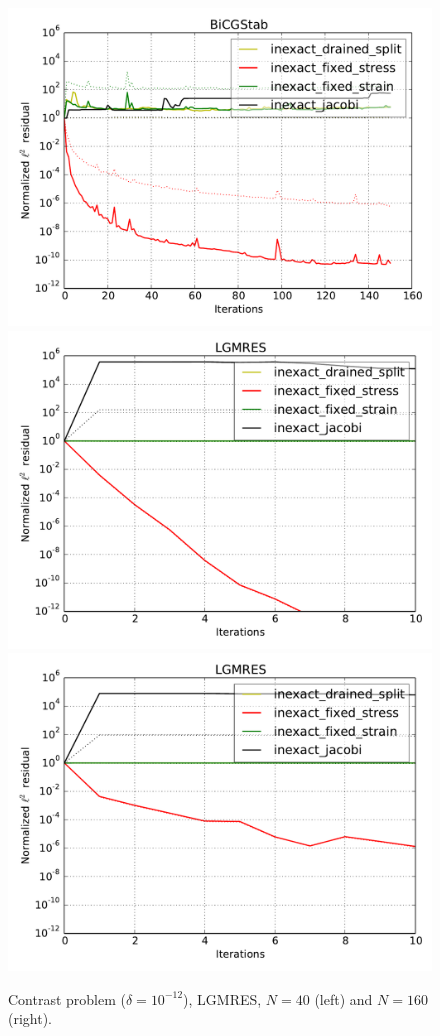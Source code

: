 \documentclass{article}
\begin{document}
\begin{figure}
\begin{center}
\includegraphics[width=0.49\linewidth]{../new-BiCGStab,problem=12,exact=0,N=160,cycles=1.pdf}
\includegraphics[width=0.49\linewidth]{../new-LGMRES,problem=12,exact=0,N=40,cycles=1.pdf}
\includegraphics[width=0.49\linewidth]{../new-LGMRES,problem=12,exact=0,N=160,cycles=1.pdf}
\caption{Contrast problem ($\delta=10^{-12}$), LGMRES, $N=40$ (left) and $N=160$ (right).}
\label{contrast12-lgmres}
\end{center}
\end{figure}
\end{document}
